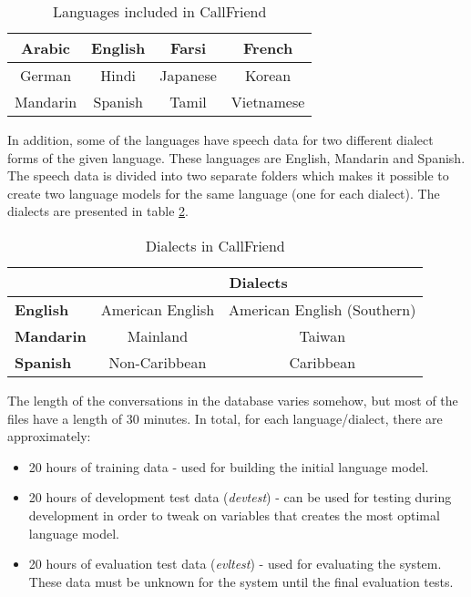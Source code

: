 \begin{table}[hbt]
	\begin{center}
	\caption{Languages included in CallFriend}
	\begin{tabular}{ | c | c | c | c |}
		\hline
		Arabic & English & Farsi & French \\ \hline 
		German & Hindi & Japanese & Korean \\ \hline 
		Mandarin & Spanish & Tamil & Vietnamese \\
		\hline
	\end{tabular}
	\label{tab:callfriend}
	\end{center}
\end{table}

In addition, some of the languages have speech data for two different dialect forms of the given language. These languages are English, Mandarin and Spanish. The speech data is divided into two separate folders which makes it possible to create two language models for the same language (one for each dialect). The dialects are presented in table \ref{tab:callfrienddial}.

\begin{table}[hbt]
	\begin{center}
	\caption{Dialects in CallFriend}
                     \begin{tabular}{ | l | c | c | }
		\cline{2-3}
		\multicolumn{1}{l}{}  & \multicolumn{2}{|c|}{\textbf{Dialects}} \\ \hline
		\textbf{English} & American English & American English (Southern) \\ \hline 
		\textbf{Mandarin} & Mainland & Taiwan \\ \hline 
		\textbf{Spanish} & Non-Caribbean & Caribbean \\
		\hline
	\end{tabular}
	\label{tab:callfrienddial}
	\end{center}
\end{table}

The length of the conversations in the database varies somehow, but most of the files have a length of 30 minutes. In total, for each language/dialect, there are approximately:

\begin{itemize}
\item 20 hours of training data - used for building the initial language model.
\item 20 hours of development test data (\emph{devtest}) - can be used for testing during development in order to tweak on variables that creates the most optimal language model.
\item 20 hours of evaluation test  data (\emph{evltest}) - used for evaluating the system. These data must be unknown for the system until the final evaluation tests.
\end{itemize}

